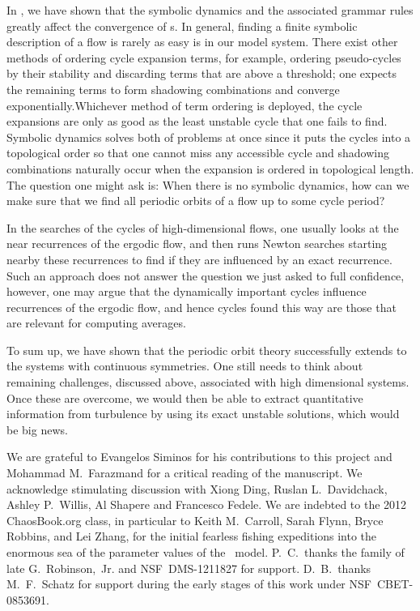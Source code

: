 \documentclass[aip,cha,
reprint,
secnumarabic,
nofootinbib, tightenlines,
nobibnotes, showkeys, showpacs,
superscriptaddress,
]{revtex4-1}
\begin{document}
{In , we have shown that the symbolic dynamics and the
associated grammar rules greatly affect the convergence of \cycForm s.
In general, finding a finite symbolic description of a flow is rarely as easy 
is in our model system. There exist other methods of ordering cycle expansion 
terms, for example, ordering pseudo-cycles by their stability and discarding 
terms that are above a threshold; one expects the remaining terms to 
form shadowing combinations and converge exponentially.Whichever method of 
term ordering is deployed, the cycle expansions are only as good as the least 
unstable cycle that one fails to find. Symbolic dynamics solves both of 
problems at once since it puts the cycles into a topological order so that one 
cannot miss any accessible cycle and shadowing combinations naturally occur 
when the expansion is ordered in topological length. The question one might 
ask is: When there is no symbolic dynamics, how can we make sure that we find 
all periodic orbits of a flow up to some cycle period?

In the searches of the cycles of high-dimensional flows, one usually looks at
the near recurrences of the ergodic flow, and then runs Newton searches
starting nearby these recurrences to find if they are influenced by an exact
recurrence. Such an approach does not answer the question we just asked to 
full confidence, however, one may argue that the dynamically important cycles
influence recurrences of the ergodic flow, and hence cycles found this way are
those that are relevant for computing averages.

To sum up, we have shown that the periodic orbit theory successfully extends 
to the systems with continuous symmetries. One still needs to think about
remaining challenges, discussed above, associated with high dimensional 
systems. Once these are overcome, we would then be able to extract 
quantitative information from turbulence by using its exact unstable solutions,
which would be big news.

\begin{acknowledgments}
We are grateful to Evangelos Siminos for his contributions to this project
and Mohammad M.~Farazmand for a critical reading of the manuscript.
We acknowledge stimulating discussion with
Xiong Ding,
Ruslan L.~Davidchack,
Ashley P.~Willis,
Al Shapere
and
Francesco Fedele.
We are indebted to the 2012 ChaosBook.org class, in particular to
Keith M.~Carroll,
Sarah Flynn,
Bryce Robbins,
and
Lei Zhang,
for the initial fearless fishing expeditions into the enormous sea of the
parameter values of the \twomode\ model.
P.~C.\ thanks the family of late G.~Robinson,~Jr.
and
NSF~DMS-1211827 for support. D.~B.\ thanks M.~F.\ Schatz for support during
the early stages of this work under NSF~CBET-0853691.
\end{acknowledgments}

}
\end{document}
